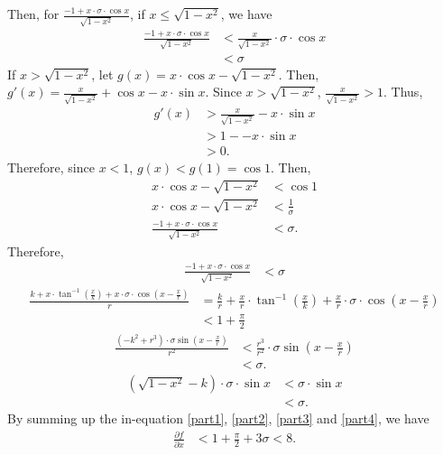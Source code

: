 Then, for  $\frac{-1+x\cdot\sigma\cdot\cos{x}}{\sqrt{1-x^2}}$, if $x\le\sqrt{1-x^2}$, we have 
\begin{align*} 
\frac{-1+x\cdot\sigma\cdot\cos{x}}{\sqrt{1-x^2}}
&  < \frac{x}{\sqrt{1-x^2}}\cdot\sigma\cdot\cos{x}\\
& < \sigma
\end{align*}
If  $x>\sqrt{1-x^2}$, let $g(x) = x\cdot\cos x - \sqrt{1-x^2}.$ Then, $g'(x) = \frac{x}{\sqrt{1-x^2}} + \cos x - x\cdot \sin x$. Since $x > \sqrt{1 - x^2}$, $\frac{x}{\sqrt{1-x^2}}> 1$. Thus,
\begin{align*} 
g'(x) & >  \frac{x}{\sqrt{1-x^2}} - x\cdot \sin x\\
& > 1-- x\cdot \sin x\\
& > 0.
\end{align*}
Therefore, since $x < 1$, $g(x) < g(1) = \cos 1$.
Then, 
\begin{align*} 
x\cdot\cos x - \sqrt{1-x^2} & < \cos 1\\
x\cdot\cos x - \sqrt{1-x^2} & < \frac{1}{\sigma}\\
\frac{-1+x\cdot\sigma\cdot\cos{x}}{\sqrt{1-x^2}}  & < \sigma.
\end{align*}
Therefore, 
\begin{align} \label{part1}
\frac{-1+x\cdot\sigma\cdot\cos{x}}{\sqrt{1-x^2}} &  < \sigma
\end{align}
\begin{align}\label{part2}
\frac{k+ x\cdot\tan^{-1}{(\frac{x}{k})}+ x\cdot\sigma\cdot\cos{(x-\frac{x}{r})}}{r}
&  = \frac{k}{r} + \frac{x}{r}\cdot\tan^{-1}{(\frac{x}{k})} + \frac{x}{r}\cdot\sigma\cdot\cos(x-\frac{x}{r})\nonumber\\
& < 1 + \frac{\pi}{2} 
\end{align}
\begin{align}\label{part3}
\frac{(-k^2+ r^3)\cdot\sigma\sin{(x-\frac{x}{r})}}{r^2} & < \frac{ r^3}{r^2}\cdot\sigma\sin{(x-\frac{x}{r})}\nonumber\\
& < \sigma.
\end{align}
\begin{align}\label{part4}
(\sqrt{1-x^2}-k)\cdot \sigma\cdot\sin{x} & < \sigma\cdot\sin{x}\nonumber\\
& < \sigma.
\end{align}
By summing up the in-equation \ref{part1}, \ref{part2}, \ref{part3} and \ref{part4}, we have 
\begin{align*}
    \frac{\partial f}{\partial x}
    & <  1+\frac{\pi}{2}+3\sigma < 8.
\end{align*}
